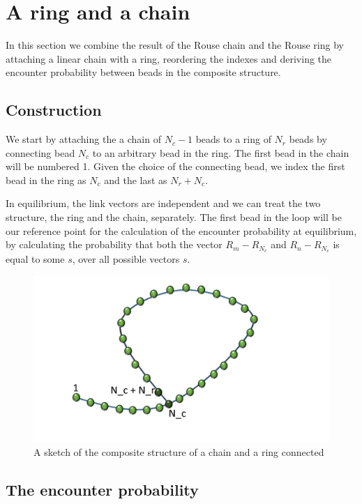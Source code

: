 \documentclass{report}
\begin{document}
\section{A ring and a chain}\label{section_aRingAndAChain}
In this section we combine the result of the Rouse chain and the Rouse ring by attaching a linear chain with a ring, reordering the indexes and deriving the encounter probability between beads in the composite structure. 

\subsection{Construction}\label{subsection_construction}
We start by attaching the a chain of $N_c-1$ beads to a ring of $N_r$ beads by connecting bead $N_c$ to an arbitrary bead in the ring. The first bead in the chain will be numbered 1. Given the choice of the connecting bead, we index the first bead in the ring as $N_c$ and the last as $N_r+N_c$. 

In equilibrium, the link vectors are independent and we can treat the two structure, the ring and the chain, separately. The first bead in the loop will be our reference point for the calculation of the encounter probability at equilibrium, by calculating the probability that both the vector $R_m-R_{N_c}$ and $R_n-R_{N_c}$ is equal to some $s$, over all possible vectors $s$.

\begin{figure}[h!]
\includegraphics[scale=0.2]{chainAndRing}
\caption{A sketch of the composite structure of a chain and a ring connected}\label{figure_sketchRingChainPolymer}
\end{figure}

\subsection{The encounter probability}\label{subsection_theEncounterProbabilityChainAndRing}
\end{document}
